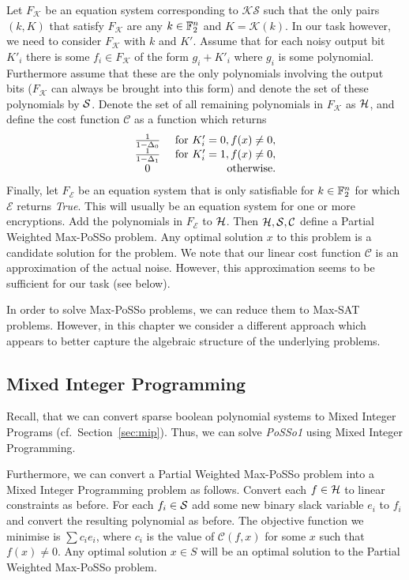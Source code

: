 Let $F_\mathcal{K}$ be an equation system corresponding to $\mathcal{KS}$ such that the only pairs $(k,K)$ that satisfy $F_\mathcal{K}$ are any $k \in \mathbb{F}_2^n$ and $K = \mathcal{K}(k)$. In our task however, 
we need to consider $F_\mathcal{K}$ with $k$ and $K'$. Assume that for each noisy output bit $K'_i$ there is some $f_i \in F_\mathcal{K}$ of the form $g_i + K'_i$ where $g_i$ is some polynomial. Furthermore assume that these are the only polynomials involving the output bits  ($F_\mathcal{K}$ can always be brought into this form) and denote the set of these polynomials by $\mathcal{S}$. Denote the set of all remaining polynomials in $F_\mathcal{K}$ as $\mathcal{H}$, and define the cost function $\mathcal{C}$ as a function which returns 
\[
\begin{array}{cr} \frac{1}{1 - \Delta_0} &\textnormal{ for } K'_i = 0, f(x) \neq 0,\\
\frac{1}{1 - \Delta_1} & \textnormal{ for } K'_i=1, f(x) \neq 0,\\
0 & \textnormal{otherwise}.\end{array}
\]
Finally, let $F_\mathcal{E}$ be an equation system that is only satisfiable for $k \in \mathbb{F}_2^n$ for which $\mathcal{E}$ returns \emph{True}. This will usually be an equation system for one or more encryptions. Add the polynomials in $F_\mathcal{E}$ to $\mathcal{H}$. Then $\mathcal{H},\mathcal{S},\mathcal{C}$ define a Partial Weighted Max-PoSSo problem. Any optimal solution $x$ to this problem is a candidate solution for the \coldboot problem. We note that our linear cost function $\mathcal{C}$ is an approximation of the actual noise. However, this approximation seems to be sufficient for our task (see below).

In order to solve Max-PoSSo problems, we can reduce them to Max-SAT problems. However, in this chapter we consider a different approach which appears to better capture the algebraic  structure of the underlying problems.

\subsection{Mixed Integer Programming}

Recall, that we can convert sparse boolean polynomial systems to Mixed Integer Programs (cf.\ Section~\ref{sec:mip}). Thus, we can solve \emph{PoSSo1} using Mixed Integer Programming.

Furthermore, we can convert a Partial Weighted Max-PoSSo problem into a Mixed Integer Programming problem as follows.
Convert each $f \in \mathcal{H}$ to linear constraints as before. For each $f_i \in \mathcal{S}$ add some new binary slack variable $e_i$ to $f_i$ and convert the resulting polynomial as before.  The objective function we minimise is $\sum c_i e_i$, where $c_i$ is the value of $\mathcal{C}(f,x)$ for some $x$ such that $f(x) \neq 0$. Any optimal solution $x \in S$ will be an optimal solution to the Partial Weighted Max-PoSSo problem.


